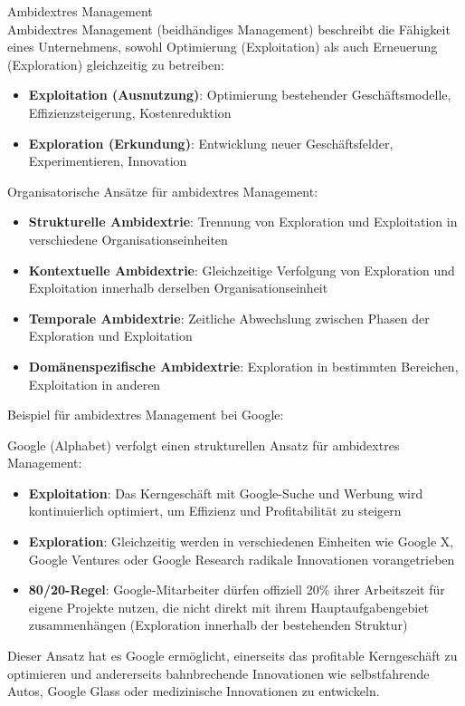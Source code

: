 \begin{concept}{Ambidextres Management}\\
Ambidextres Management (beidhändiges Management) beschreibt die Fähigkeit eines Unternehmens, sowohl Optimierung (Exploitation) als auch Erneuerung (Exploration) gleichzeitig zu betreiben:
\begin{itemize}
    \item \textbf{Exploitation (Ausnutzung)}: Optimierung bestehender Geschäftsmodelle, Effizienzsteigerung, Kostenreduktion
    \item \textbf{Exploration (Erkundung)}: Entwicklung neuer Geschäftsfelder, Experimentieren, Innovation
\end{itemize}

Organisatorische Ansätze für ambidextres Management:
\begin{itemize}
    \item \textbf{Strukturelle Ambidextrie}: Trennung von Exploration und Exploitation in verschiedene Organisationseinheiten
    \item \textbf{Kontextuelle Ambidextrie}: Gleichzeitige Verfolgung von Exploration und Exploitation innerhalb derselben Organisationseinheit
    \item \textbf{Temporale Ambidextrie}: Zeitliche Abwechslung zwischen Phasen der Exploration und Exploitation
    \item \textbf{Domänenspezifische Ambidextrie}: Exploration in bestimmten Bereichen, Exploitation in anderen
\end{itemize}
\end{concept}

\begin{example}
Beispiel für ambidextres Management bei Google:

Google (Alphabet) verfolgt einen strukturellen Ansatz für ambidextres Management:
\begin{itemize}
    \item \textbf{Exploitation}: Das Kerngeschäft mit Google-Suche und Werbung wird kontinuierlich optimiert, um Effizienz und Profitabilität zu steigern
    \item \textbf{Exploration}: Gleichzeitig werden in verschiedenen Einheiten wie Google X, Google Ventures oder Google Research radikale Innovationen vorangetrieben
    \item \textbf{80/20-Regel}: Google-Mitarbeiter dürfen offiziell 20\% ihrer Arbeitszeit für eigene Projekte nutzen, die nicht direkt mit ihrem Hauptaufgabengebiet zusammenhängen (Exploration innerhalb der bestehenden Struktur)
\end{itemize}

Dieser Ansatz hat es Google ermöglicht, einerseits das profitable Kerngeschäft zu optimieren und andererseits bahnbrechende Innovationen wie selbstfahrende Autos, Google Glass oder medizinische Innovationen zu entwickeln.
\end{example}

